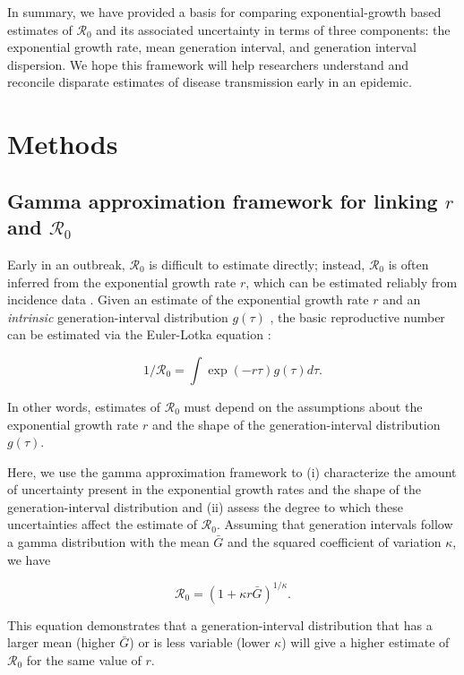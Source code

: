 \documentclass[12pt]{article}
\newcommand{\Ro}{\ensuremath{{\mathcal R}_{0}}\xspace}
\begin{document}
In summary, we have provided a basis for comparing exponential-growth based estimates of \Ro and its associated uncertainty in terms of three components: the exponential growth rate, mean generation interval, and generation interval dispersion. 
We hope this framework will help researchers understand and reconcile disparate estimates of disease transmission early in an epidemic.

\section{Methods}

\subsection{Gamma approximation framework for linking $r$ and $\Ro$}

Early in an outbreak, \Ro is difficult to estimate directly;
instead, \Ro is often inferred from the exponential growth rate $r$, which can be estimated reliably from incidence data \citep{mills2004transmissibility, nishiura2009transmission, ma2014estimating}.
Given an estimate of the exponential growth rate $r$ and an \emph{intrinsic} generation-interval distribution $g(\tau)$ \citep{champredon2015intrinsic}, the basic reproductive
number can be estimated via the Euler-Lotka equation \citep{wallinga2007generation}:
\begin{linenomath*}
\begin{equation}
1/\Ro = \int \exp(-r\tau) g(\tau) d\tau.
\label{eq:euler}
\end{equation}
\end{linenomath*}
In other words, estimates of \Ro must
depend on the assumptions about the
exponential growth rate $r$ and the shape of the generation-interval distribution $g(\tau)$.

Here, we use the gamma approximation framework \citep{mcbryde2009early, nishiura2009transmission, roberts2011early, park2019practical} to (i) characterize the amount of uncertainty present in the exponential growth rates and the shape of the generation-interval distribution and (ii) assess the degree to which these uncertainties affect the estimate of \Ro.
Assuming that generation intervals follow a gamma distribution
with the mean $\bar G$ and the squared coefficient of variation $\kappa$, 
we have
\begin{linenomath*}
\begin{equation}
\Ro = \left(1 + \kappa r \bar{G}\right)^{1/\kappa}.
\label{eq:gamma}
\end{equation}
\end{linenomath*}
This equation demonstrates that a generation-interval distribution
that has a larger mean (higher $\bar{G}$) or is less variable (lower $\kappa$)
will give a higher estimate of \Ro for the same value of $r$.
\end{document}
